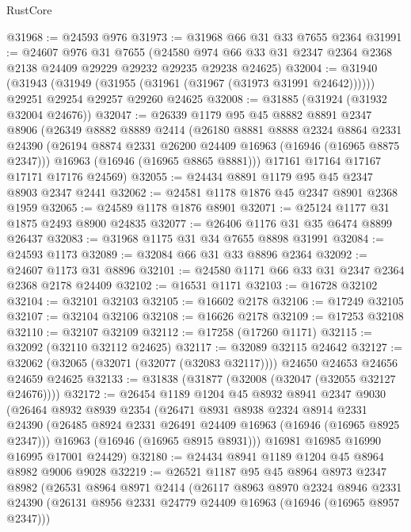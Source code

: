 \begin{lexlean}{RustCore}
\begin{coremodule}
@31968 := @24593 @976
@31973 := @31968 @66 @31 @33 @7655 @2364
@31991 := @24607
    @976
    @31
    @7655
    (@24580 @974 @66 @33 @31 @2347 @2364 @2368 @2138 @24409 @29229 @29232 @29235 @29238 @24625)
@32004 := @31940
    (@31943 (@31949 (@31955 (@31961 (@31967 (@31973 @31991 @24642))))))
    @29251
    @29254
    @29257
    @29260
    @24625
@32008 := @31885 (@31924 (@31932 @32004 @24676))
@32047 := @26339
    @1179
    @95
    @45
    @8882
    @8891
    @2347
    @8906
    (@26349
      @8882
      @8889
      @2414
      (@26180
        @8881
        @8888
        @2324
        @8864
        @2331
        @24390
        (@26194 @8874 @2331 @26200 @24409 @16963 (@16946 (@16965 @8875 @2347)))
        @16963
        (@16946 (@16965 @8865 @8881)))
      @17161
      @17164
      @17167
      @17171
      @17176
      @24569)
@32055 := @24434 @8891 @1179 @95 @45 @2347 @8903 @2347 @2441
@32062 := @24581 @1178 @1876 @45 @2347 @8901 @2368 @1959
@32065 := @24589 @1178 @1876 @8901
@32071 := @25124 @1177 @31 @1875 @2493 @8900 @24835
@32077 := @26406 @1176 @31 @35 @6474 @8899 @26437
@32083 := @31968 @1175 @31 @34 @7655 @8898 @31991
@32084 := @24593 @1173
@32089 := @32084 @66 @31 @33 @8896 @2364
@32092 := @24607 @1173 @31 @8896
@32101 := @24580 @1171 @66 @33 @31 @2347 @2364 @2368 @2178 @24409
@32102 := @16531 @1171
@32103 := @16728 @32102
@32104 := @32101 @32103
@32105 := @16602 @2178
@32106 := @17249 @32105
@32107 := @32104 @32106
@32108 := @16626 @2178
@32109 := @17253 @32108
@32110 := @32107 @32109
@32112 := @17258 (@17260 @1171)
@32115 := @32092 (@32110 @32112 @24625)
@32117 := @32089 @32115 @24642
@32127 := @32062 (@32065 (@32071 (@32077 (@32083 @32117)))) @24650 @24653 @24656 @24659 @24625
@32133 := @31838 (@31877 (@32008 (@32047 (@32055 @32127 @24676))))
@32172 := @26454
    @1189
    @1204
    @45
    @8932
    @8941
    @2347
    @9030
    (@26464
      @8932
      @8939
      @2354
      (@26471
        @8931
        @8938
        @2324
        @8914
        @2331
        @24390
        (@26485 @8924 @2331 @26491 @24409 @16963 (@16946 (@16965 @8925 @2347)))
        @16963
        (@16946 (@16965 @8915 @8931)))
      @16981
      @16985
      @16990
      @16995
      @17001
      @24429)
@32180 := @24434 @8941 @1189 @1204 @45 @8964 @8982 @9006 @9028
@32219 := @26521
    @1187
    @95
    @45
    @8964
    @8973
    @2347
    @8982
    (@26531
      @8964
      @8971
      @2414
      (@26117
        @8963
        @8970
        @2324
        @8946
        @2331
        @24390
        (@26131 @8956 @2331 @24779 @24409 @16963 (@16946 (@16965 @8957 @2347)))

\end{coremodule}
\end{lexlean}
